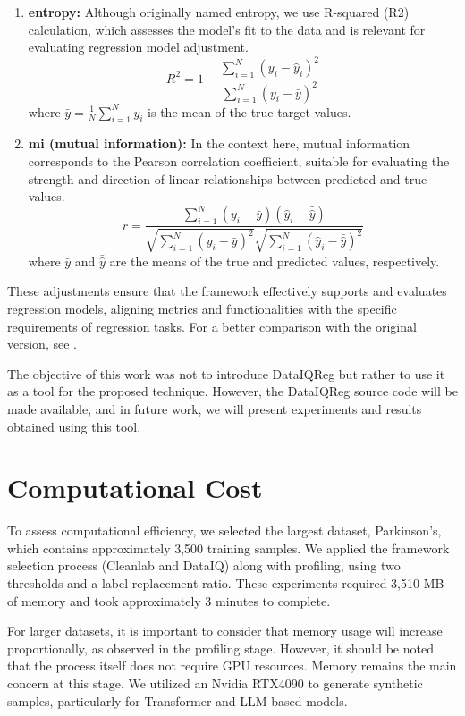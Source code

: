 \documentclass{article}
\theoremstyle{plain}
\theoremstyle{definition}
\theoremstyle{remark}
\begin{document}
\begin{enumerate}
\item \textbf{entropy:} Although originally named entropy, we use R-squared (R2) calculation, which assesses the model's fit to the data and is relevant for evaluating regression model adjustment.
\[
R^2 = 1 - \frac{\sum_{i=1}^{N} \left( y_i - \hat{y}_i \right)^2}{\sum_{i=1}^{N} \left( y_i - \bar{y} \right)^2}
\]
where \( \bar{y} = \frac{1}{N} \sum_{i=1}^{N} y_i \) is the mean of the true target values.
\item \textbf{mi (mutual information):} In the context here, mutual information corresponds to the Pearson correlation coefficient, suitable for evaluating the strength and direction of linear relationships between predicted and true values.
\[
r = \frac{\sum_{i=1}^{N} \left( y_i - \bar{y} \right) \left( \hat{y}_i - \bar{\hat{y}} \right)}{\sqrt{\sum_{i=1}^{N} \left( y_i - \bar{y} \right)^2} \sqrt{\sum_{i=1}^{N} \left( \hat{y}_i - \bar{\hat{y}} \right)^2}}
\]
where \( \bar{y} \) and \( \bar{\hat{y}} \) are the means of the true and predicted values, respectively.
\end{enumerate}

These adjustments ensure that the framework effectively supports and evaluates regression models, aligning metrics and functionalities with the specific requirements of regression tasks. For a better comparison with the original version, see  \cite{article}.


The objective of this work was not to introduce DataIQReg but rather to use it as a tool for the proposed technique. However, the DataIQReg source code will be made available, and in future work, we will present experiments and results obtained using this tool.

\section{Computational Cost}\label{appsec:cost}

To assess computational efficiency, we selected the largest dataset, Parkinson’s, which contains approximately 3,500 training samples. We applied the framework selection process (Cleanlab and DataIQ) along with profiling, using two thresholds and a label replacement ratio. These experiments required 3,510 MB of memory and took approximately 3 minutes to complete.

For larger datasets, it is important to consider that memory usage will increase proportionally, as observed in the profiling stage. However, it should be noted that the process itself does not require GPU resources. Memory remains the main concern at this stage. We utilized an Nvidia RTX4090 to generate synthetic samples, particularly for Transformer and LLM-based models.
\end{document}
